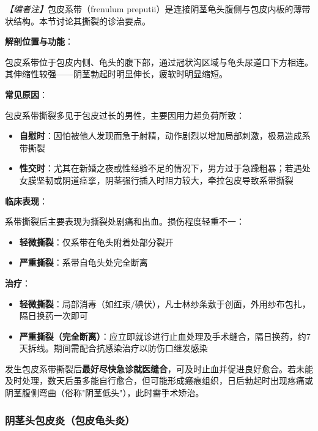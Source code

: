 \noindent\textit{【编者注】}包皮系带（frenulum preputii）是连接阴茎龟头腹侧与包皮内板的薄带状结构。本节讨论其撕裂的诊治要点。

\vspace{0.5em}
\noindent\textbf{解剖位置与功能}：

包皮系带位于包皮内侧、龟头的腹下部，通过冠状沟区域与龟头尿道口下方相连。其伸缩性较强——阴茎勃起时明显伸长，疲软时明显缩短。

\vspace{0.5em}
\noindent\textbf{常见原因}：

包皮系带撕裂多见于包皮过长的男性，主要因用力超负荷所致：
\begin{itemize}
	\item \textbf{自慰时}：因怕被他人发现而急于射精，动作剧烈以增加局部刺激，极易造成系带撕裂
	\item \textbf{性交时}：尤其在新婚之夜或性经验不足的情况下，男方过于急躁粗暴；若遇处女膜坚韧或阴道痉挛，阴茎强行插入时阻力较大，牵拉包皮导致系带撕裂
\end{itemize}

\vspace{0.5em}
\noindent\textbf{临床表现}：

系带撕裂后主要表现为撕裂处剧痛和出血。损伤程度轻重不一：
\begin{itemize}
	\item \textbf{轻微撕裂}：仅系带在龟头附着处部分裂开
	\item \textbf{严重撕裂}：系带自龟头处完全断离
\end{itemize}

\vspace{0.5em}
\noindent\textbf{治疗}：
\begin{itemize}
	\item \textbf{轻微撕裂}：局部消毒（如红汞/碘伏），凡士林纱条敷于创面，外用纱布包扎，隔日换药一次即可
	\item \textbf{严重撕裂（完全断离）}：应立即就诊进行止血处理及手术缝合，隔日换药，约7天拆线。期间需配合抗感染治疗以防伤口继发感染
\end{itemize}

\begin{tcolorbox}[colback=pink!5!white,colframe=red!50!black,title=贴心小叮咛]
发生包皮系带撕裂后\textbf{最好尽快急诊就医缝合}，可及时止血并促进良好愈合。若未能及时处理，数天后虽多能自行愈合，但可能形成瘢痕组织，日后勃起时出现疼痛或阴茎腹侧弯曲（俗称"阴茎低头"），此时需手术矫治。
\end{tcolorbox}

\subsubsection{阴茎头包皮炎（包皮龟头炎）}

